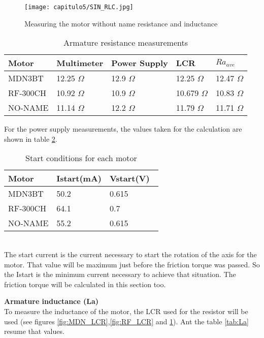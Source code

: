 \begin{figure}[H]
\centering
		\texttt{[image: capitulo5/SIN\_RLC.jpg]}
	\caption{Measuring the motor without name resistance and inductance}
	\label{fig:SIN_LCR}
\end{figure}

\begin{table}[H]
\centering
\begin{tabular}{ | l | l | l | l |l | }
\hline\hline
	\textbf{Motor} & \textbf{Multimeter} & \textbf{Power Supply} & \textbf{LCR} &\textbf{ $Ra_{ave}$ }\\ \hline
	MDN3BT & 12.25 $\Omega$ & 12.9 $\Omega$ & 12.25 $\Omega$& 12.47 $\Omega$\\ \hline
RF-300CH & 10.92 $\Omega$& 10.9 $\Omega$& 10.679 $\Omega$& 10.83 $\Omega$\\ \hline
NO-NAME & 11.14  $\Omega$& 12.2 $\Omega$& 11.79 $\Omega$& 11.71 $\Omega$\\ \hline\hline 
\end{tabular}
\caption{Armature resistance measurements} \label{tab:Ra}
\end{table}
For the power supply measurements, the values taken for the calculation are shown in table \ref{tab:arranque}.
\begin{table}[H]
\centering
\begin{tabular}{ | l | l | l |  }
\hline\hline
		\textbf{Motor} & Istart(mA) & Vstart(V)\  \\ \hline
		MDN3BT  & 50.2 & 0.615  \\ \hline
	RF-300CH & 64.1  & 0.7 \\ \hline
	NO-NAME & 55.2  & 0.615 \\  \hline\hline
\end{tabular}
\caption{Start conditions for each motor} \label{tab:arranque}
\end{table}
\\

The start current is the current necessary to start the rotation of the axis for the motor. That value will be maximum just before the friction torque was passed. So the Istart is the minimum current necessary to achieve that situation. The friction torque will be calculated in this section too.

\textbf{Armature inductance (La)} \\
To measure the inductance of the motor, the LCR used for the resistor will be used (see figures \ref{fig:MDN_LCR},\ref{fig:RF_LCR} and \ref{fig:SIN_LCR}). Ant the table \ref{tab:La} resume that values.

